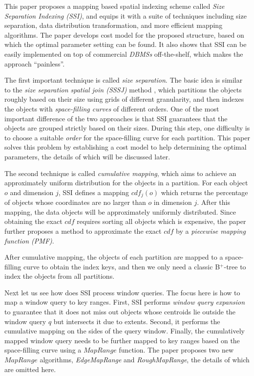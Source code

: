\documentclass[paper=a4, fontsize=18pt]{article} %
\numberwithin{equation}{section} %
\numberwithin{figure}{section} %
\numberwithin{table}{section} %
\begin{document}
This paper proposes a mapping based spatial indexing scheme called \emph{Size Separation Indexing (SSI)}, and equips it with a suite of techniques including size separation, data distribution transformation, and more efficient mapping algorithms. The paper develops cost model for the proposed structure, based on which the optimal parameter setting can be found. It also shows that SSI can be easily implemented on top of commercial \emph{DBMSs} off-the-shelf, which makes the approach ``painless''.

The first important technique is called \emph{size  separation}. The basic idea is similar to the \emph{size separation spatial join (SSSJ)} method \cite{KS97}, which partitions the objects roughly based on their size using grids of different granularity, and then indexes the objects with \emph{space-filling curves} of different orders. One of the most important difference of the two approaches is that SSI guarantees that the objects are grouped strictly based on their sizes. During this step, one difficulty is to choose a suitable \emph{order} for the space-filling curve for each partition. This paper solves this problem by establishing a cost model to help determining the optimal parameters, the details of which will be discussed later.

The second technique is called \emph{cumulative mapping}, which aims to achieve an approximately uniform distribution for the objects in a partition. For each object $o$ and dimension $j$, SSI defines a mapping $cdf_j(o)$ which returns the percentage of objects whose coordinates are no larger than $o$ in dimension $j$. After this mapping, the data objects will be approximately uniformly distributed. Since obtaining the exact $cdf$ requires sorting all objects which is expensive, the paper further proposes a method to approximate the exact $cdf$ by a \emph{piecewise mapping function (PMF)}.

After cumulative mapping, the objects of each partition are mapped to a space-filling curve to obtain the index keys, and then we only need a classic B$^+$-tree to index the objects from all partitions.

Next let us see how does SSI process window queries. The focus here is how to map a window query to key ranges. First, SSI performs \emph{window query expansion} to guarantee that it does not miss out objects whose centroids lie outside the window query $q$ but intersects it due to extents. Second, it performs the cumulative mapping on the sides of the query window. Finally, the cumulatively mapped window query needs to be further mapped to key ranges based on the space-filling curve using a $MapRange$ function.
The paper proposes two new $MapRange$ algorithms, \emph{EdgeMapRange} and \emph{RoughMapRange}, the details of which are omitted here.
\end{document}
